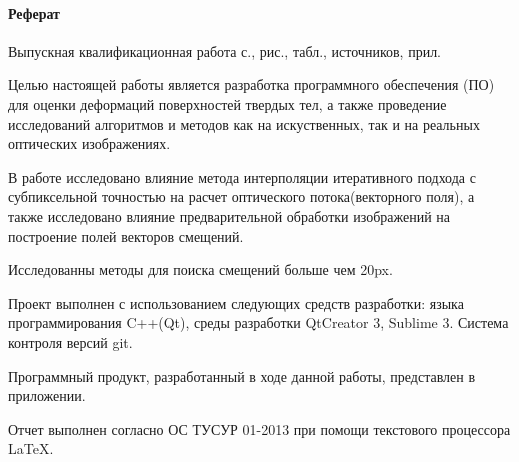 \newpage
{}
\paragraph{\hfill Реферат \hfill}
Выпускная квалификационная работа  с.,  рис.,  табл.,  источников,  прил.

Целью настоящей работы является разработка программного обеспечения (ПО) для оценки деформаций поверхностей твердых тел, а также проведение исследований алгоритмов и методов как на искуственных, так и на реальных оптических изображениях.

В работе исследовано влияние метода интерполяции итеративного подхода с субпиксельной точностью на расчет оптического потока(векторного поля), а также исследовано влияние предварительной обработки изображений на построение полей векторов смещений.

Исследованны методы для поиска смещений больше чем 20px. 

 

Проект выполнен с использованием следующих средств разработки: языка программирования C++(Qt), среды разработки QtCreator 3, Sublime 3. Система контроля версий git.

Программный продукт, разработанный в ходе данной работы, представлен в приложении.

Отчет выполнен согласно ОС ТУСУР 01-2013 при помощи текстового процессора \LaTeX.